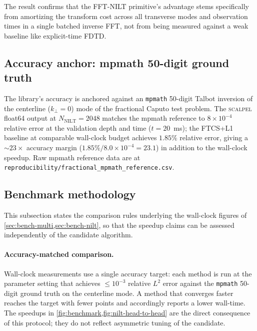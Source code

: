 \documentclass[manuscript,review]{acmart}
\newcommand{\kperp}{k_\perp}
\newcommand{\scalpel}{\textsc{scalpel}}
\begin{document}
The result confirms that the FFT-NILT primitive's advantage stems
specifically from amortizing the transform cost across all
transverse modes and observation times in a single batched inverse
FFT, not from being measured against a weak baseline like
explicit-time FDTD.

\subsection{Accuracy anchor: mpmath 50-digit ground truth}\label{sec:bench-mpmath}

The library's accuracy is anchored against an \texttt{mpmath} 50-digit
Talbot inversion of the centerline ($\kperp = 0$) mode of the
fractional Caputo test problem. The \scalpel{} float64 output at
$N_{\mathrm{NILT}} = 2048$ matches the mpmath reference to $8 \times
10^{-4}$ relative error at the validation depth and time
($t = 20$~ms); the FTCS+L1 baseline at comparable wall-clock
budget achieves $1.85\%$ relative error, giving a $\sim 23\times$
accuracy margin ($1.85\% / 8.0\times 10^{-4} = 23.1$) in addition
to the wall-clock speedup. Raw mpmath
reference data are at
\texttt{reproducibility/fractional\_mpmath\_reference.csv}.

\subsection{Benchmark methodology}\label{sec:bench-methodology}

This subsection states the comparison rules underlying the
wall-clock figures of \cref{sec:bench-multi,sec:bench-nilt}, so that
the speedup claims can be assessed independently of the candidate
algorithm.

\paragraph{Accuracy-matched comparison.}
Wall-clock measurements use a single accuracy target: each method is
run at the parameter setting that achieves $\le 10^{-3}$ relative
$L^2$ error against the \texttt{mpmath} 50-digit ground truth on the
centerline mode. A method that converges faster reaches the target
with fewer points and accordingly reports a lower wall-time. The
speedups in \cref{fig:benchmark,fig:nilt-head-to-head} are the
direct consequence of this protocol; they do not reflect
asymmetric tuning of the candidate.
\end{document}
